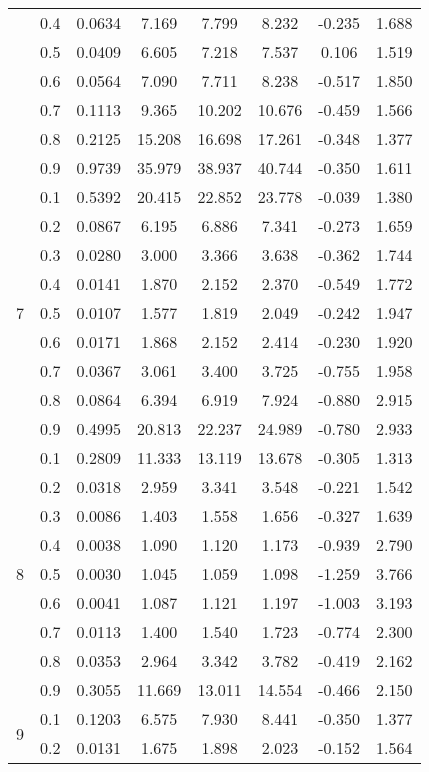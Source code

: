 \documentclass[11pt,a4paper]{report}
\begin{document}
\begin{longtable}{ | c | c || c | c | c | c | c | c | }
 & 0.4 & 0.0634 & 7.169 & 7.799 & 8.232 & -0.235 & 1.688 \\
 & 0.5 & 0.0409 & 6.605 & 7.218 & 7.537 & 0.106 & 1.519 \\
 & 0.6 & 0.0564 & 7.090 & 7.711 & 8.238 & -0.517 & 1.850 \\
 & 0.7 & 0.1113 & 9.365 & 10.202 & 10.676 & -0.459 & 1.566 \\
 & 0.8 & 0.2125 & 15.208 & 16.698 & 17.261 & -0.348 & 1.377 \\
 & 0.9 & 0.9739 & 35.979 & 38.937 & 40.744 & -0.350 & 1.611 \\
 \hline
\multirow{9}{*}{7} & 0.1 & 0.5392 & 20.415 & 22.852 & 23.778 & -0.039 & 1.380 \\
 & 0.2 & 0.0867 & 6.195 & 6.886 & 7.341 & -0.273 & 1.659 \\
 & 0.3 & 0.0280 & 3.000 & 3.366 & 3.638 & -0.362 & 1.744 \\
 & 0.4 & 0.0141 & 1.870 & 2.152 & 2.370 & -0.549 & 1.772 \\
 & 0.5 & 0.0107 & 1.577 & 1.819 & 2.049 & -0.242 & 1.947 \\
 & 0.6 & 0.0171 & 1.868 & 2.152 & 2.414 & -0.230 & 1.920 \\
 & 0.7 & 0.0367 & 3.061 & 3.400 & 3.725 & -0.755 & 1.958 \\
 & 0.8 & 0.0864 & 6.394 & 6.919 & 7.924 & -0.880 & 2.915 \\
 & 0.9 & 0.4995 & 20.813 & 22.237 & 24.989 & -0.780 & 2.933 \\
 \hline
\multirow{9}{*}{8} & 0.1 & 0.2809 & 11.333 & 13.119 & 13.678 & -0.305 & 1.313 \\
 & 0.2 & 0.0318 & 2.959 & 3.341 & 3.548 & -0.221 & 1.542 \\
 & 0.3 & 0.0086 & 1.403 & 1.558 & 1.656 & -0.327 & 1.639 \\
 & 0.4 & 0.0038 & 1.090 & 1.120 & 1.173 & -0.939 & 2.790 \\
 & 0.5 & 0.0030 & 1.045 & 1.059 & 1.098 & -1.259 & 3.766 \\
 & 0.6 & 0.0041 & 1.087 & 1.121 & 1.197 & -1.003 & 3.193 \\
 & 0.7 & 0.0113 & 1.400 & 1.540 & 1.723 & -0.774 & 2.300 \\
 & 0.8 & 0.0353 & 2.964 & 3.342 & 3.782 & -0.419 & 2.162 \\
 & 0.9 & 0.3055 & 11.669 & 13.011 & 14.554 & -0.466 & 2.150 \\
 \hline
\multirow{9}{*}{9} & 0.1 & 0.1203 & 6.575 & 7.930 & 8.441 & -0.350 & 1.377 \\
 & 0.2 & 0.0131 & 1.675 & 1.898 & 2.023 & -0.152 & 1.564 \\

\end{longtable}
\end{document}

